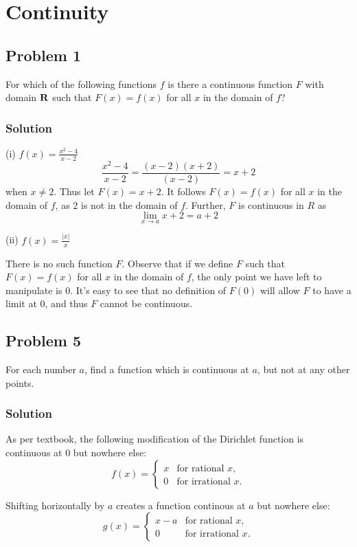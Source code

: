 \section{Continuity}
\subsection*{Problem 1}
For which of the following functions $f$ is there a continuous function $F$ with domain $\mathbf{R}$ such that $F(x)=f(x)$ for all $x$ in the domain of $f$?

\subsubsection*{Solution}
(i) $f(x)=\frac{x^2-4}{x-2}$
\[\frac{x^2-4}{x-2}=\frac{(x-2)(x+2)}{(x-2)}=x+2\]
when $x\neq 2$. Thus let $F(x)=x+2$. It follows $F(x)=f(x)$ for all $x$ in the domain of $f$, as $2$ is not in the domain of $f$. Further, $F$ is continuous in $R$ as
\[\lim_{x\to a}x+2=a+2\]

(ii) $f(x)=\frac{|x|}{x}$

There is no such function $F$. Observe that if we define $F$ such that $F(x)=f(x)$ for all $x$ in the domain of $f$, the only point we have left to manipulate is $0$. It's easy to see that no definition of $F(0)$ will allow $F$ to have a limit at $0$, and thus $F$ cannot be continuous.

\subsection*{Problem 5}
For each number $a$, find a function which is continuous at $a$, but not at any other points.

\subsubsection*{Solution}
As per textbook, the following modification of the Dirichlet function
is continuous at $0$ but nowhere else:
\[
f(x) = 
\begin{cases} 
x & \text{for rational } x,\\
0 & \text{for irrational } x.
\end{cases}
\]

Shifting horizontally by $a$ creates a function continous at $a$ but
nowhere else:
\[
g(x) = 
\begin{cases} 
x-a & \text{for rational } x,\\
0 & \text{for irrational } x.
\end{cases}
\]



